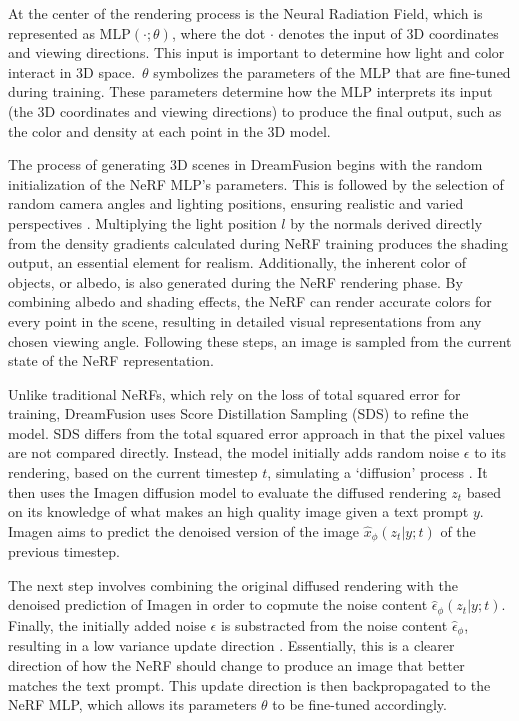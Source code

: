 At the center of the rendering process is the Neural Radiation Field, which is represented as \( \text{MLP}(\cdot; \theta) \), where the dot \(\cdot\) denotes the input of 3D coordinates and viewing directions. This input is important to determine how light and color interact in 3D space.~\(\theta\) symbolizes the parameters of the MLP that are fine-tuned during training. These parameters determine how the MLP interprets its input (the 3D coordinates and viewing directions) to produce the final output, such as the color and density at each point in the 3D model.

The process of generating 3D scenes in DreamFusion begins with the random initialization of the NeRF MLP's parameters. This is followed by the selection of random camera angles and lighting positions, ensuring realistic and varied perspectives \citep{pooleDreamfusion}. Multiplying the light position \( l \) by the normals derived directly from the density gradients calculated during NeRF training produces the shading output, an essential element for realism. Additionally, the inherent color of objects, or albedo, is also generated during the NeRF rendering phase. By combining albedo and shading effects, the NeRF can render accurate colors for every point in the scene, resulting in detailed visual representations from any chosen viewing angle. Following these steps, an image is sampled from the current state of the NeRF representation.

Unlike traditional NeRFs, which rely on the loss of total squared error for training, DreamFusion uses Score Distillation Sampling (SDS) to refine the model. SDS differs from the total squared error approach in that the pixel values are not compared directly. Instead, the model initially adds random noise \(\epsilon\) to its rendering, based on the current timestep \(t\),  simulating a `diffusion' process \citep{pooleDreamfusion}. It then uses the Imagen diffusion model to evaluate the diffused rendering \(z_t\) based on its knowledge of what makes an high quality image given a text prompt \(y\). Imagen aims to predict the denoised version of the image \(\hat{x}_\phi(z_t | y; t)\) of the previous timestep. 

The next step involves combining the original diffused rendering with the denoised prediction of Imagen in order to copmute the noise content \( \hat{\epsilon}_\phi(z_t | y; t) \). Finally, the initially added noise \(\epsilon\) is substracted from the noise content \(\hat{\epsilon}_\phi\), resulting in a low variance update direction \citep{pooleDreamfusion}. Essentially, this is a clearer direction of how the NeRF should change to produce an image that better matches the text prompt. This update direction is then backpropagated to the NeRF MLP, which allows its parameters \(\theta\) to be fine-tuned accordingly.


